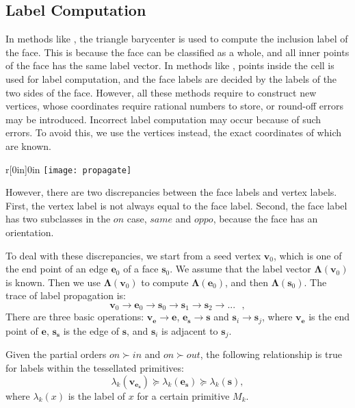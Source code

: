 \subsection{Label Computation}
\label{sec:propagation}

In methods like \cite{feito2013fast,ogayar2015deferred}, the triangle barycenter is used to compute the inclusion label of the face. This is because the face can be classified as a whole, and all inner points of the face has the same label vector. In methods like \cite{zhou2016mesh}, points inside the cell is used for label computation, and the face labels are decided by the labels of the two sides of the face. However, all these methods require to construct new vertices, whose coordinates require rational numbers to store, or round-off errors may be introduced. Incorrect label computation may occur because of such errors. To avoid this, we use the vertices instead, the exact coordinates of which are known.

\begin{wrapfigure}{r}[0in]{0in}
\texttt{[image: propagate]}
\end{wrapfigure}


However, there are two discrepancies between the face labels and vertex labels. First, the vertex label is not always equal to the face label. Second, the face label has two subclasses in the $on$ case, $same$ and $oppo$, because the face has an orientation.

To deal with these discrepancies, we start from a seed vertex $\bm{v}_0$, which is one of the end point of an edge $\bm{e}_0$ of a face $\bm{s}_0$. We assume that the label vector $\bm{\Lambda}(\bm{v}_0)$ is known.
Then we use $\bm{\Lambda}(\bm{v}_0)$ to compute $\bm{\Lambda}(\bm{e}_0)$, and then $\bm{\Lambda}(\bm{s}_0)$. The trace of label propagation is:
\begin{equation}
\bm{v}_0\to \bm{e}_0\to \bm{s}_0\to \bm{s}_1\to \bm{s}_2\to ...~~~,
\end{equation}
There are three basic operations: $\bm{v}_{\bm{e}}\to \bm{e}$, $\bm{e}_{\bm{s}}\to \bm{s}$ and $\bm{s}_i\to \bm{s}_j$, where $\bm{v}_{\bm{e}}$ is the end point of $\bm{e}$,
$\bm{s}_{\bm{s}}$ is the edge of $\bm{s}$,
and $\bm{s}_i$ is adjacent to $\bm{s}_j$.

\begin{theorem}
  \label{thm:porder}
  Given the partial orders $on \succ in$ and $on \succ out$, the following relationship is true for labels within the tessellated primitives:
  \begin{equation}
    \lambda_k(\bm{v}_{\bm{e}_{\bm{s}}}) \succeq \lambda_k(\bm{e}_{\bm{s}}) \succeq \lambda_k(\bm{s}),
  \end{equation}
  where $\lambda_k(x)$ is the label of $x$ for a certain primitive $M_k$.
\end{theorem}

